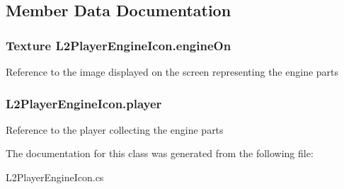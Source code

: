 \subsection{Member Data Documentation}
\hypertarget{class_l2_player_engine_icon_a634b2ec6b0dfb77eca75328c43986b77}{
\subsubsection[{engine\-On}]{\setlength{\rightskip}{0pt plus 5cm}Texture L2\-Player\-Engine\-Icon.\-engine\-On}}\label{class_l2_player_engine_icon_a634b2ec6b0dfb77eca75328c43986b77}
Reference to the image displayed on the screen representing the engine parts \hypertarget{class_l2_player_engine_icon_aade810346a1d59d61fe8775670926534}{
\subsubsection[{player}]{ L2\-Player\-Engine\-Icon.\-player}}\label{class_l2_player_engine_icon_aade810346a1d59d61fe8775670926534}
Reference to the player collecting the engine parts 

The documentation for this class was generated from the following file\-:\begin{DoxyCompactItemize}
\item 
L2\-Player\-Engine\-Icon.\-cs\end{DoxyCompactItemize}

